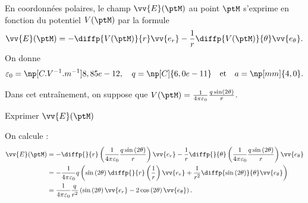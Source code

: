 En coordonnées polaires, le champ $\vv{E}(\ptM)$ au point $\ptM$ s'exprime en fonction du potentiel $V(\ptM)$ par la formule
	\[
		\vv{E}(\ptM) = -\diffp{V(\ptM)}{r}\vv{e_{r}} -\frac{1}{r}\diffp{V(\ptM)}{\theta}\vv{e_{\theta}}.
	\]
On donne 
\[
\varepsilon_0 = \np[C.V^{-1}.m^{-1}]{8,85e-12}, \quad q=\np[C]{6,0e-11}\quad\text{et}\quad a = \np[mm]{4,0}.
\]

\medskip

Dans cet entraînement, on suppose que $V(\ptM) = \frac{1}{4\pi\varepsilon_0} \frac{q \sin\left( 2\theta\right) }{r}$.


\debutEntrainement


\begin{enonce}
	Exprimer $\vv{E}(\ptM)$ 
\end{enonce}


\begin{corrige}
On calcule :
	\begin{align*}
		\vv{E}(\ptM) &= -\diffp{}{r} \left(  \frac{1}{4\pi\varepsilon_0} \frac{q \sin\left( 2\theta\right) }{r} \right)  \vv{e_{r}} - \frac{1}{r}\diffp{}{\theta} \left(  \frac{1}{4\pi\varepsilon_0} \frac{q \sin\left( 2\theta\right) }{r} \right)  \vv{e_{\theta}}\\
		&= -\frac{1}{4\pi\varepsilon_0} q \left( \sin\left( 2\theta\right) \diffp{}{r}\left( \frac{1}{r}\right)\vv{e_{r}} + \frac{1}{r^2}\diffp{\sin\left( 2\theta\right)}{\theta}\vv{e_{\theta}}  \right)\\
		&= \frac{1}{4\pi\varepsilon_0}\frac{q}{r^2} \left( \sin\left( 2\theta\right) \vv{e_{r}} - 2\cos\left( 2\theta\right) \vv{e_{\theta}} \right).
	\end{align*}
\end{corrige}





